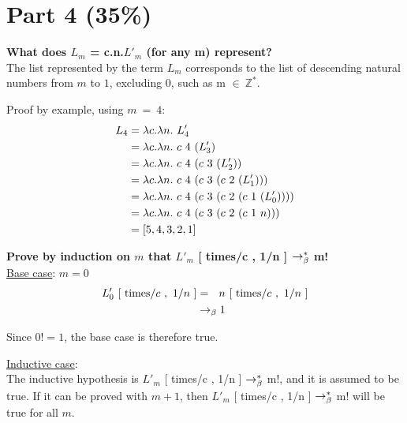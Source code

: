 \documentclass{article}
\begin{document}
	
	\section{Part 4 (35\%)}

	\begin{Large}
		\textbf{What does $L_m$ = \lamb c.\lamb n.$L'_m$ (for any m) represent?}\\
		
		The list represented by the term $L_m$ corresponds to the list of descending natural numbers from $m$ to $1$, excluding 0, such as m $\in \ \mathbb{Z}^*$.
		\newline
		
		Proof by example, using $m \ = \ 4$:
		\begin{align*}
			L_4 &= \la c.\la n. \ L_4^\prime \\
			&= \la c.\la n. \ c \  4 \ ( L_3^\prime ) \\
			&= \la c.\la n. \ c \  4 \ ( c \ 3 \ (L_2^\prime )) \\
			&= \la c.\la n. \ c \  4 \ ( c \ 3 \ (c \ 2 \ (L_1^\prime ))) \\
			&= \la c.\la n. \ c \  4 \ ( c \ 3 \ (c \ 2 \ (c \ 1 \ (L_0^\prime )))) \\
			&= \la c.\la n. \ c \  4 \ ( c \ 3 \ (c \ 2 \ (c \ 1 \ n))) \\
			&= [5,4,3,2,1]
		\end{align*}
		\newline

		\textbf{Prove by induction on $m$ that $L'_m$ [ times/c , 1/n ] $\rightarrow_\beta^*$  m!}\\
		
		\underline{Base case}: $m=0$
		\begin{align*}
			L_0^\prime \ [\ \tim / c \ , \ 1/n \ ] &= \saq n \ [\ \tim / c \ , \ 1/n \ ] \\
			&\equals 1
		\end{align*}
		
		Since $0! = 1$, the base case is therefore true.
		\newline
		
		\underline{Inductive case}: \\
		
		The inductive hypothesis is $L'_m$ [ times/c , 1/n ] $\rightarrow_\beta^*$  m!, and it is assumed to be true.
		If it can be proved with $m+1$, then $L'_m$ [ times/c , 1/n ] $\rightarrow_\beta^*$  m! will be true for all $m$.
		

\end{Large}
\end{document}
